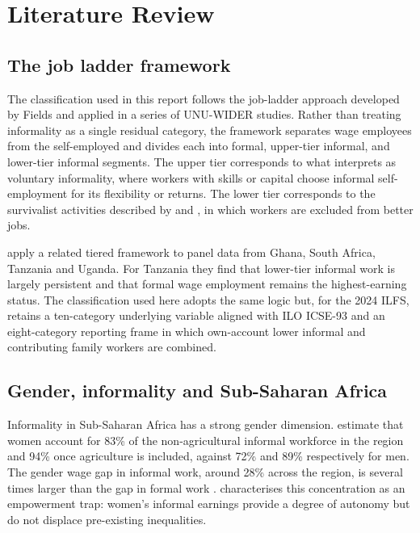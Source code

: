 \documentclass[12pt,a4paper]{article}
\begin{document}
\section{Literature Review}

\subsection{The job ladder framework}

The classification used in this report follows the job-ladder approach developed by Fields \citep{fields2023,fields2020} and applied in a series of UNU-WIDER studies. Rather than treating informality as a single residual category, the framework separates wage employees from the self-employed and divides each into formal, upper-tier informal, and lower-tier informal segments. The upper tier corresponds to what \citet{maloney2004} interprets as voluntary informality, where workers with skills or capital choose informal self-employment for its flexibility or returns. The lower tier corresponds to the survivalist activities described by \citet{laporta2014} and \citet{banerjee2007}, in which workers are excluded from better jobs.

\citet{danquah2021} apply a related tiered framework to panel data from Ghana, South Africa, Tanzania and Uganda. For Tanzania they find that lower-tier informal work is largely persistent and that formal wage employment remains the highest-earning status. The classification used here adopts the same logic but, for the 2024 ILFS, retains a ten-category underlying variable aligned with ILO ICSE-93 and an eight-category reporting frame in which own-account lower informal and contributing family workers are combined.

\subsection{Gender, informality and Sub-Saharan Africa}

Informality in Sub-Saharan Africa has a strong gender dimension. \citet{malta2019} estimate that women account for 83\% of the non-agricultural informal workforce in the region and 94\% once agriculture is included, against 72\% and 89\% respectively for men. The gender wage gap in informal work, around 28\% across the region, is several times larger than the gap in formal work \citep{worldbank2017}. \citet{meagher2010} characterises this concentration as an empowerment trap: women's informal earnings provide a degree of autonomy but do not displace pre-existing inequalities.
\end{document}
